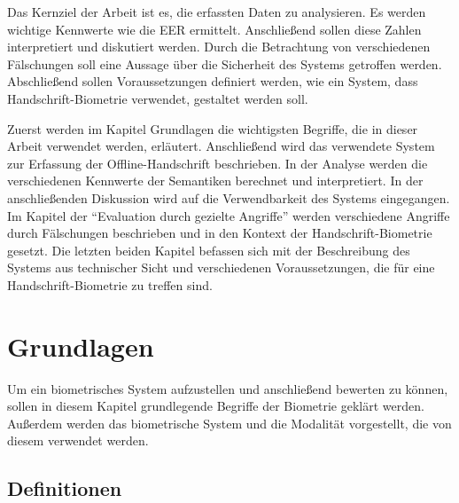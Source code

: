 \documentclass{article}
\begin{document}
Das Kernziel der Arbeit ist es, die erfassten Daten zu analysieren. Es werden wichtige Kennwerte
wie die EER ermittelt. Anschließend sollen diese Zahlen interpretiert und diskutiert werden. Durch die
Betrachtung von verschiedenen Fälschungen soll eine Aussage über die Sicherheit des Systems
getroffen werden. Abschließend sollen Voraussetzungen definiert werden, wie ein System, dass
Handschrift-Biometrie verwendet, gestaltet werden soll.

Zuerst werden im Kapitel Grundlagen die wichtigsten Begriffe, die in dieser Arbeit verwendet werden,
erläutert. Anschließend wird das verwendete System zur Erfassung der Offline-Handschrift beschrieben.
In der Analyse werden die verschiedenen Kennwerte der Semantiken berechnet und interpretiert. In der
anschließenden Diskussion wird auf die Verwendbarkeit des Systems eingegangen. Im Kapitel der 
``Evaluation durch gezielte Angriffe'' werden verschiedene Angriffe durch Fälschungen beschrieben und in den 
Kontext der Handschrift-Biometrie gesetzt. Die letzten beiden Kapitel befassen sich mit der Beschreibung
des Systems aus technischer Sicht und verschiedenen Voraussetzungen, die für eine Handschrift-Biometrie
zu treffen sind.

\section{Grundlagen}

Um ein biometrisches System aufzustellen und anschließend bewerten zu können, sollen in diesem Kapitel
grundlegende Begriffe der Biometrie geklärt werden. Außerdem werden das biometrische System und die
Modalität vorgestellt, die von diesem verwendet werden.

\subsection{Definitionen}
\end{document}
